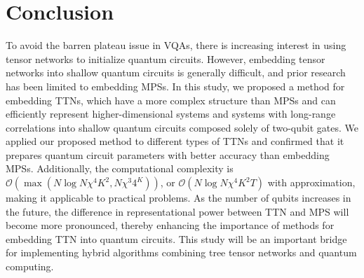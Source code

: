 \documentclass[12pt,dvipdfmx,twoside,openright]{report}
\begin{document}
\chapter{Conclusion}
To avoid the barren plateau issue in VQAs, there is increasing interest in using tensor networks to initialize quantum circuits. 
However, embedding tensor networks into shallow quantum circuits is generally difficult, and prior research has been limited to embedding MPSs.
In this study, we proposed a method for embedding TTNs, which have a more complex structure than MPSs and can efficiently represent higher-dimensional systems and systems with long-range correlations into shallow quantum circuits composed solely of two-qubit gates.
We applied our proposed method to different types of TTNs and confirmed that it prepares quantum circuit parameters with better accuracy than embedding MPSs.
Additionally, the computational complexity is $\mathcal{O}(\max (N\log{N}\chi^4 K^2, N\chi^3 4^K))$, or $\mathcal{O}(N\log{N}\chi^4 K^2T)$ with approximation, making it applicable to practical problems.
As the number of qubits increases in the future, the difference in representational power between TTN and MPS will become more pronounced, thereby enhancing the importance of methods for embedding TTN into quantum circuits.
This study will be an important bridge for implementing hybrid algorithms combining tree tensor networks and quantum computing.



\end{document}
